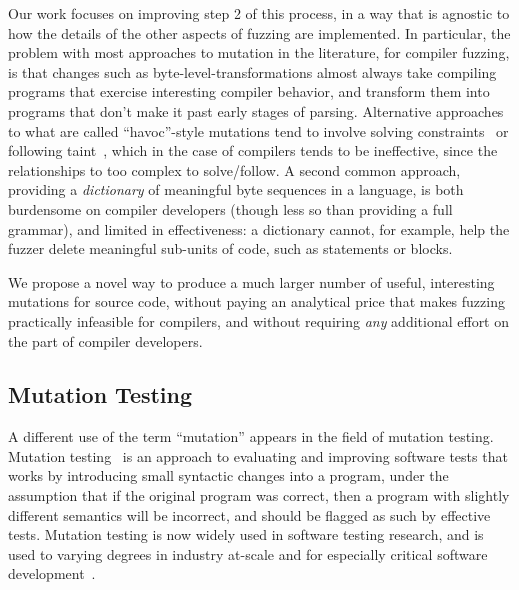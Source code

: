 Our work focuses on improving step 2 of this process, in a way that is agnostic to how the details of the other aspects of fuzzing are implemented.  In particular, the problem with most approaches to mutation in the literature, for compiler fuzzing, is that changes such as byte-level-transformations almost always take compiling programs that exercise interesting compiler behavior, and transform them into programs that don't make it past early stages of parsing.  Alternative approaches to what are called ``havoc''-style mutations tend to involve solving constraints~\cite{Eclipser} or following taint~\cite{Angora}, which in the case of compilers tends to be ineffective, since the relationships to too complex to solve/follow.  A second common approach, providing a \emph{dictionary} of meaningful byte sequences in a language, is both burdensome on compiler developers (though less so than providing a full grammar), and limited in effectiveness: a dictionary cannot, for example, help the fuzzer delete meaningful sub-units of code, such as statements or blocks.

We propose a novel way to produce a much larger number of useful, interesting mutations for source code, without paying an analytical price that makes fuzzing practically infeasible for compilers, and without requiring \emph{any} additional effort on the part of compiler developers.

\subsection{Mutation Testing}

A different use of the term ``mutation'' appears in the field of mutation testing.  Mutation testing~\cite{MutationSurvey,budd1979mutation,demillo1978hints} is an approach to evaluating and improving software tests that works by introducing small syntactic changes into a program, under the assumption that if the original program was correct, then a program with slightly different semantics will be incorrect, and should be flagged as such by effective tests.  Mutation testing is now widely used in software testing research, and is used to varying degrees in industry at-scale and for especially critical software development~\cite{mutKernel,mutGoogle,mutFacebook}.

